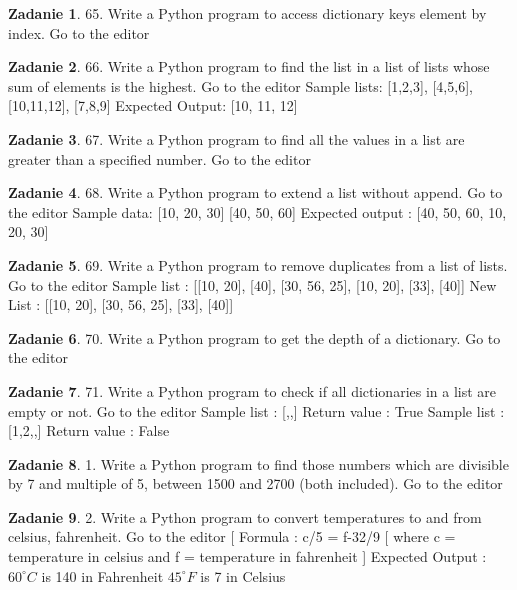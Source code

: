 \documentclass[11pt]{article}
\theoremstyle{definition}
\newtheorem{zadanie}{Zadanie}
\begin{document}
\begin{zadanie}
65. Write a Python program to access dictionary keys element by index. Go to the editor
\end{zadanie}

\begin{zadanie}
66. Write a Python program to find the list in a list of lists whose sum of elements is the highest. Go to the editor
Sample lists: [1,2,3], [4,5,6], [10,11,12], [7,8,9]
Expected Output: [10, 11, 12]
\end{zadanie}

\begin{zadanie}
67. Write a Python program to find all the values in a list are greater than a specified number. Go to the editor
\end{zadanie}

\begin{zadanie}
68. Write a Python program to extend a list without append. Go to the editor
Sample data: [10, 20, 30]
[40, 50, 60]
Expected output : [40, 50, 60, 10, 20, 30]
\end{zadanie}

\begin{zadanie}
69. Write a Python program to remove duplicates from a list of lists. Go to the editor
Sample list : [[10, 20], [40], [30, 56, 25], [10, 20], [33], [40]]
New List : [[10, 20], [30, 56, 25], [33], [40]]
\end{zadanie}

\begin{zadanie}
70. Write a Python program to get the depth of a dictionary. Go to the editor
\end{zadanie}

\begin{zadanie}
71. Write a Python program to check if all dictionaries in a list are empty or not. Go to the editor
Sample list : [{},{},{}]
Return value : True
Sample list : [{1,2},{},{}]
Return value : False
\end{zadanie}

\begin{zadanie}
1. Write a Python program to find those numbers which are divisible by 7 and multiple of 5, between 1500 and 2700 (both included). Go to the editor
\end{zadanie}

\begin{zadanie}
2. Write a Python program to convert temperatures to and from celsius, fahrenheit. Go to the editor
[ Formula : c/5 = f-32/9 [ where c = temperature in celsius and f = temperature in fahrenheit ]
Expected Output :
$60^\circ C$ is 140 in Fahrenheit
$45^\circ F$ is 7 in Celsius
\end{zadanie}
\end{document}
